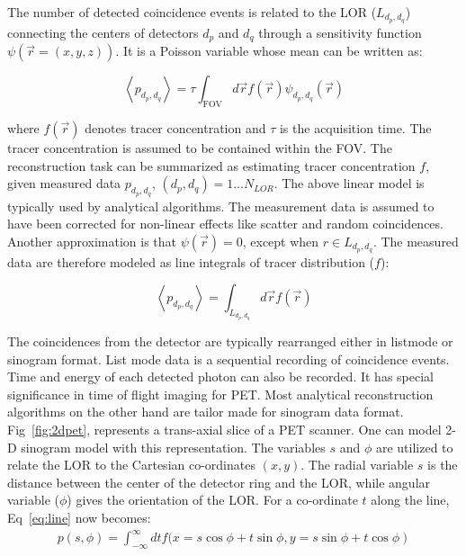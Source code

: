  The number of detected coincidence events is related to the \ac{LOR} ($L_{d_{p},d_{q}}$) connecting the centers of detectors $d_p$ and $d_q$ through a sensitivity function $\psi(\vec{r}=(x,y,z))$. It is a Poisson variable whose mean can be written as:

\begin{equation}\label{eq:analy}
\left\langle p_{d_{p},d_{q}}\right\rangle=\tau \int_{\mathrm{FOV}} d \vec{r} f(\vec{r}) \psi_{d_{p}, d_{q}}(\vec{r})
\end{equation}

where $f(\vec{r})$ denotes tracer concentration and $\tau$ is the acquisition time. The tracer concentration is assumed to be contained within the \ac{FOV}. The reconstruction task can be summarized as estimating tracer concentration $f$, given measured data $p_{d_{p},d_{q}}$, $(d_{p},d_{q})=1\dots N_{LOR}$. The above linear model is typically used by analytical algorithms. The measurement data is assumed to have been corrected for non-linear effects like scatter and random coincidences. Another approximation is that $\psi(\vec{r})=0$, except when $r\in L_{d_{p},d_{q}} $. The measured data are therefore modeled as line integrals of tracer distribution ($f$): 

\begin{equation}
\label{eq:line}
\left\langle p_{d_{p}, d_{q}}\right\rangle=\int_{L_{d_{p}, d_{q}}} d \vec{r} f(\vec{r})
\end{equation}

The coincidences from the detector are typically rearranged either in listmode or sinogram format. List mode data is a sequential recording of coincidence events. Time and energy of each detected photon can also be recorded. It has special significance in time of flight imaging for \ac{PET}. Most analytical reconstruction algorithms on the other hand are tailor made for sinogram data format. Fig~\ref{fig:2dpet}, represents a trans-axial slice of a \ac{PET} scanner. One can model 2-D sinogram model with this representation. The variables $s$ and $\phi$ are utilized to relate the \ac{LOR} to the Cartesian co-ordinates $(x,y)$. The radial variable $s$ is the distance between the center of the detector ring and the \ac{LOR}, while angular variable ($\phi$) gives the orientation of the \ac{LOR}. 
For a co-ordinate $t$ along the line, Eq~\ref{eq:line} now becomes:
\begin{equation}\label{eq:line_sino}
\begin{array}{c}
p\left(s, \phi\right)=\int_{-\infty}^{\infty} d t f(x= s \cos\phi +t \sin \phi, 
\left.y=s \sin \phi + t \cos \phi\right)
\end{array}
\end{equation}

